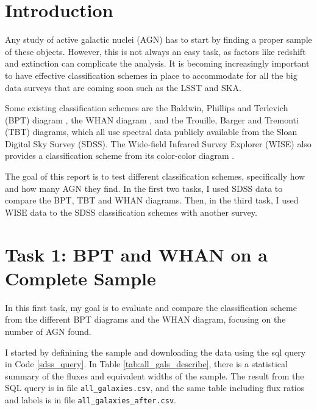 \documentclass[letterpaper, oneside]{article}
\begin{document}
	
	\templatePagecfg
	
	
	\section*{Introduction}
	
	Any study of active galactic nuclei (AGN) has to start by finding a proper sample of these objects. However, this is not always an easy task, as factors like redshift and extinction can complicate the analysis. It is becoming increasingly important to have effective classification schemes in place to accommodate for all the big data surveys that are coming soon such as the LSST and SKA.
	
	Some existing classification schemes are the Baldwin, Phillips and Terlevich (BPT) diagram \cite{Baldwin_1981}, the WHAN diagram \cite{Cid_2011}, and the Trouille, Barger and Tremonti (TBT) diagrams, which all use spectral data publicly available from the Sloan Digital Sky Survey (SDSS). The Wide-field Infrared Survey Explorer (WISE) \cite{Wright_2010} also provides a classification scheme from its color-color diagram \cite{Mateos_2012, Mateos_2012}.
	
	The goal of this report is to test different classification schemes, specifically how and how many AGN they find. In the first two tasks, I used SDSS data to compare the BPT, TBT and WHAN diagrams. Then, in the third task, I used WISE data to the SDSS classification schemes with another survey.
	
	
	\section*{Task 1: BPT and WHAN on a Complete Sample}
	
	In this first task, my goal is to evaluate and compare the classification scheme from the different BPT diagrams and the WHAN diagram, focusing on the number of AGN found.
	
	I started by definining the sample and downloading the data using the sql query in Code \ref{sdss_query}. In Table \ref{tab:all_gals_describe}, there is a statistical summary of the fluxes and equivalent widths of the sample. The result from the SQL query is in file \texttt{all\_galaxies.csv}, and the same table including flux ratios and labels is in file \texttt{all\_galaxies\_after.csv}.
	
\end{document}

